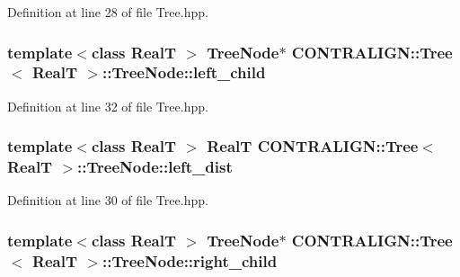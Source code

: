 Definition at line 28 of file Tree.\+hpp.

\hypertarget{struct_c_o_n_t_r_a_l_i_g_n_1_1_tree_1_1_tree_node_acf53eb4bc788a05fa2f53d61ec7384e9}{
\subsubsection[{left\+\_\+child}]{\setlength{\rightskip}{0pt plus 5cm}template$<$class Real\+T $>$ {\bf Tree\+Node}$\ast$ {\bf C\+O\+N\+T\+R\+A\+L\+I\+G\+N\+::\+Tree}$<$ Real\+T $>$\+::Tree\+Node\+::left\+\_\+child}}\label{struct_c_o_n_t_r_a_l_i_g_n_1_1_tree_1_1_tree_node_acf53eb4bc788a05fa2f53d61ec7384e9}


Definition at line 32 of file Tree.\+hpp.

\hypertarget{struct_c_o_n_t_r_a_l_i_g_n_1_1_tree_1_1_tree_node_a0ab61d516eb4bba0c92d77f793e22103}{
\subsubsection[{left\+\_\+dist}]{\setlength{\rightskip}{0pt plus 5cm}template$<$class Real\+T $>$ Real\+T {\bf C\+O\+N\+T\+R\+A\+L\+I\+G\+N\+::\+Tree}$<$ Real\+T $>$\+::Tree\+Node\+::left\+\_\+dist}}\label{struct_c_o_n_t_r_a_l_i_g_n_1_1_tree_1_1_tree_node_a0ab61d516eb4bba0c92d77f793e22103}


Definition at line 30 of file Tree.\+hpp.

\hypertarget{struct_c_o_n_t_r_a_l_i_g_n_1_1_tree_1_1_tree_node_a89df07cf7699c58d8b4ef594322a0e1a}{
\subsubsection[{right\+\_\+child}]{\setlength{\rightskip}{0pt plus 5cm}template$<$class Real\+T $>$ {\bf Tree\+Node}$\ast$ {\bf C\+O\+N\+T\+R\+A\+L\+I\+G\+N\+::\+Tree}$<$ Real\+T $>$\+::Tree\+Node\+::right\+\_\+child}}\label{struct_c_o_n_t_r_a_l_i_g_n_1_1_tree_1_1_tree_node_a89df07cf7699c58d8b4ef594322a0e1a}


